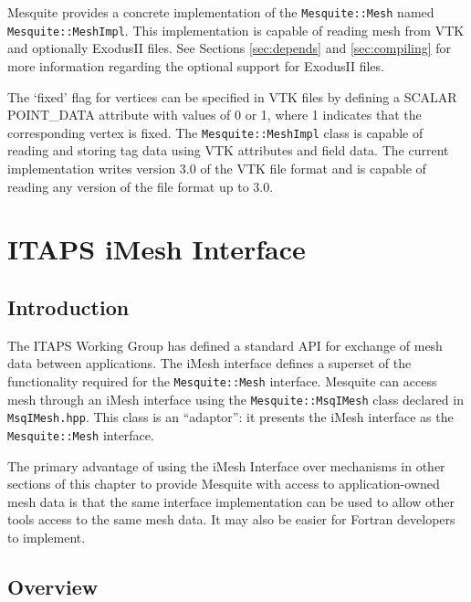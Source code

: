 Mesquite provides a concrete implementation of the \texttt{Mesquite::Mesh} named
\texttt{Mesquite::MeshImpl}.  This implementation is capable of reading mesh from
VTK\cite{VTKbook, VTKuml} and optionally ExodusII files. See Sections 
\ref{sec:depends} and \ref{sec:compiling} for more 
information regarding the optional support for ExodusII files.

The `fixed' flag for vertices can be specified in VTK files by defining a
SCALAR POINT\_DATA attribute with values of 0 or 1, where 1 indicates that the
corresponding vertex is fixed.  The \texttt{Mesquite::MeshImpl} class is capable
of reading and storing tag data 
using VTK attributes and
field data.  The current implementation writes version 3.0 of the VTK file format
and is capable of reading any version of the file format up to 3.0.  



\section{ITAPS iMesh Interface}

\subsection{Introduction}

The ITAPS Working Group has defined a standard API for exchange of mesh data between applications.  The iMesh interface\cite{imesh} defines a superset of the functionality required for the \texttt{Mesquite::Mesh} interface.  Mesquite can access mesh through an iMesh interface using the \texttt{Mesquite::MsqIMesh} class declared in \texttt{MsqIMesh.hpp}.  This class is an ``adaptor'':  it presents the iMesh interface as the \texttt{Mesquite::Mesh} interface.  

The primary advantage of using the iMesh Interface over mechanisms in other sections of this chapter to provide Mesquite with access to application-owned mesh data is that the same interface implementation can be used to allow other tools access to the same mesh data.  It may also be easier for Fortran developers to implement.

\subsection{Overview}

